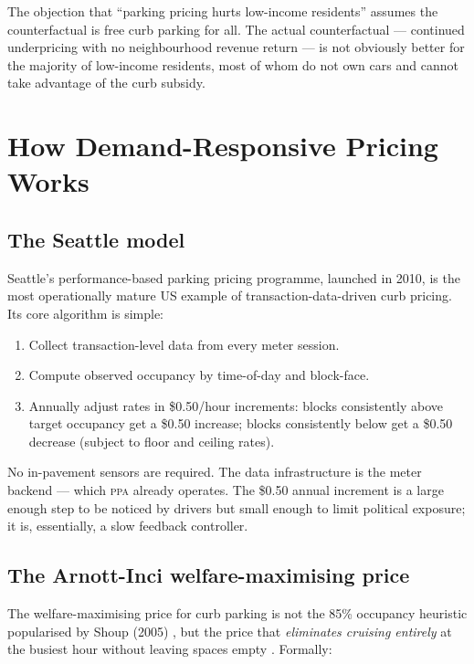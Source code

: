 \documentclass[11pt, letterpaper]{article}
\newcommand{\ppa}{\textsc{ppa}}
\begin{document}
The objection that ``parking pricing hurts low-income residents'' assumes the
counterfactual is free curb parking for all. The actual counterfactual ---
continued underpricing with no neighbourhood revenue return --- is not
obviously better for the majority of low-income residents, most of whom do
not own cars and cannot take advantage of the curb subsidy.

\clearpage

\section{How Demand-Responsive Pricing Works}
\label{sec:mechanism}

\subsection{The Seattle model}

Seattle's performance-based parking pricing programme, launched in 2010, is
the most operationally mature US example of transaction-data-driven curb
pricing. Its core algorithm is simple:
\begin{enumerate}
  \item Collect transaction-level data from every meter session.
  \item Compute observed occupancy by time-of-day and block-face.
  \item Annually adjust rates in \$0.50/hour increments: blocks consistently
        above target occupancy get a \$0.50 increase; blocks consistently
        below get a \$0.50 decrease (subject to floor and ceiling rates).
\end{enumerate}

No in-pavement sensors are required. The data infrastructure is the meter
backend --- which \ppa{} already operates. The \$0.50 annual increment is a
large enough step to be noticed by drivers but small enough to limit political
exposure; it is, essentially, a slow feedback controller.

\subsection{The Arnott-Inci welfare-maximising price}

The welfare-maximising price for curb parking is not the 85\% occupancy
heuristic popularised by Shoup (2005) \cite{shoup2005}, but the price that
\emph{eliminates cruising entirely} at the busiest hour without leaving
spaces empty \cite{arnott2006}. Formally:
\end{document}
